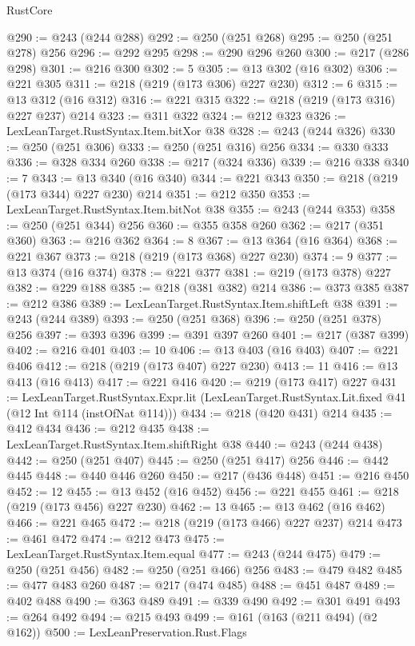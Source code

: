 \begin{lexlean}{RustCore}
\begin{coremodule}
@290 := @243 (@244 @288)
@292 := @250 (@251 @268)
@295 := @250 (@251 @278) @256
@296 := @292 @295
@298 := @290 @296 @260
@300 := @217 (@286 @298)
@301 := @216 @300
@302 := 5
@305 := @13 @302 (@16 @302)
@306 := @221 @305
@311 := @218 (@219 (@173 @306) @227 @230)
@312 := 6
@315 := @13 @312 (@16 @312)
@316 := @221 @315
@322 := @218 (@219 (@173 @316) @227 @237) @214
@323 := @311 @322
@324 := @212 @323
@326 := LexLeanTarget.RustSyntax.Item.bitXor @38
@328 := @243 (@244 @326)
@330 := @250 (@251 @306)
@333 := @250 (@251 @316) @256
@334 := @330 @333
@336 := @328 @334 @260
@338 := @217 (@324 @336)
@339 := @216 @338
@340 := 7
@343 := @13 @340 (@16 @340)
@344 := @221 @343
@350 := @218 (@219 (@173 @344) @227 @230) @214
@351 := @212 @350
@353 := LexLeanTarget.RustSyntax.Item.bitNot @38
@355 := @243 (@244 @353)
@358 := @250 (@251 @344) @256
@360 := @355 @358 @260
@362 := @217 (@351 @360)
@363 := @216 @362
@364 := 8
@367 := @13 @364 (@16 @364)
@368 := @221 @367
@373 := @218 (@219 (@173 @368) @227 @230)
@374 := 9
@377 := @13 @374 (@16 @374)
@378 := @221 @377
@381 := @219 (@173 @378) @227
@382 := @229 @188
@385 := @218 (@381 @382) @214
@386 := @373 @385
@387 := @212 @386
@389 := LexLeanTarget.RustSyntax.Item.shiftLeft @38
@391 := @243 (@244 @389)
@393 := @250 (@251 @368)
@396 := @250 (@251 @378) @256
@397 := @393 @396
@399 := @391 @397 @260
@401 := @217 (@387 @399)
@402 := @216 @401
@403 := 10
@406 := @13 @403 (@16 @403)
@407 := @221 @406
@412 := @218 (@219 (@173 @407) @227 @230)
@413 := 11
@416 := @13 @413 (@16 @413)
@417 := @221 @416
@420 := @219 (@173 @417) @227
@431 := LexLeanTarget.RustSyntax.Expr.lit
    (LexLeanTarget.RustSyntax.Lit.fixed @41 (@12 Int @114 (instOfNat @114)))
@434 := @218 (@420 @431) @214
@435 := @412 @434
@436 := @212 @435
@438 := LexLeanTarget.RustSyntax.Item.shiftRight @38
@440 := @243 (@244 @438)
@442 := @250 (@251 @407)
@445 := @250 (@251 @417) @256
@446 := @442 @445
@448 := @440 @446 @260
@450 := @217 (@436 @448)
@451 := @216 @450
@452 := 12
@455 := @13 @452 (@16 @452)
@456 := @221 @455
@461 := @218 (@219 (@173 @456) @227 @230)
@462 := 13
@465 := @13 @462 (@16 @462)
@466 := @221 @465
@472 := @218 (@219 (@173 @466) @227 @237) @214
@473 := @461 @472
@474 := @212 @473
@475 := LexLeanTarget.RustSyntax.Item.equal
@477 := @243 (@244 @475)
@479 := @250 (@251 @456)
@482 := @250 (@251 @466) @256
@483 := @479 @482
@485 := @477 @483 @260
@487 := @217 (@474 @485)
@488 := @451 @487
@489 := @402 @488
@490 := @363 @489
@491 := @339 @490
@492 := @301 @491
@493 := @264 @492
@494 := @215 @493
@499 := @161 (@163 (@211 @494) (@2 @162))
@500 := LexLeanPreservation.Rust.Flags

\end{coremodule}
\end{lexlean}
